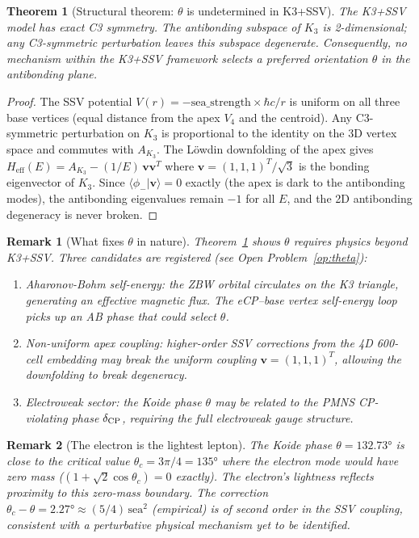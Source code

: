 \documentclass[11pt]{article}
\newtheorem{theorem}{Theorem}[section]
\newtheorem{remark}{Remark}[section]
\begin{document}
\begin{theorem}[Structural theorem: $\theta$ is undetermined in K3+SSV]
\label{thm:theta_free}
The K3+SSV model has exact C3 symmetry.  The antibonding subspace
of $K_3$ is 2-dimensional; any C3-symmetric perturbation leaves this
subspace degenerate.  Consequently, no mechanism within the K3+SSV
framework selects a preferred orientation $\theta$ in the antibonding
plane.
\end{theorem}

\begin{proof}
The SSV potential $V(r) = -\mathrm{sea\_strength}\times\hbar c/r$ is
uniform on all three base vertices (equal distance from the apex $V_4$
and the centroid).  Any C3-symmetric perturbation on $K_3$ is
proportional to the identity on the 3D vertex space and commutes
with $A_{K_3}$.  The Löwdin downfolding of the apex gives
$H_\mathrm{eff}(E) = A_{K_3} - (1/E)\,\mathbf{v}\mathbf{v}^T$ where
$\mathbf{v} = (1,1,1)^T/\sqrt{3}$ is the bonding eigenvector of $K_3$.
Since $\langle\phi_-|\mathbf{v}\rangle = 0$ exactly (the apex is dark
to the antibonding modes), the antibonding eigenvalues remain $-1$
for all $E$, and the 2D antibonding degeneracy is never broken.
\end{proof}

\begin{remark}[What fixes $\theta$ in nature]
Theorem~\ref{thm:theta_free} shows $\theta$ requires physics beyond K3+SSV.
Three candidates are registered (see Open Problem~\ref{op:theta}):
\begin{enumerate}
\item \emph{Aharonov-Bohm self-energy}: the ZBW orbital circulates on
  the K3 triangle, generating an effective magnetic flux.  The eCP--base
  vertex self-energy loop picks up an AB phase that could select $\theta$.
\item \emph{Non-uniform apex coupling}: higher-order SSV corrections
  from the 4D 600-cell embedding may break the uniform coupling
  $\mathbf{v} = (1,1,1)^T$, allowing the downfolding to break degeneracy.
\item \emph{Electroweak sector}: the Koide phase $\theta$ may be related
  to the PMNS CP-violating phase $\delta_{\rm CP}$, requiring the full
  electroweak gauge structure.
\end{enumerate}
\end{remark}

\begin{remark}[The electron is the lightest lepton]
The Koide phase $\theta = 132.73°$ is close to the critical value
$\theta_c = 3\pi/4 = 135°$ where the electron mode would have zero mass
($(1+\sqrt{2}\cos\theta_c) = 0$ exactly).  The electron's lightness
reflects proximity to this zero-mass boundary.  The correction
$\theta_c - \theta = 2.27° \approx (5/4)\,\mathrm{sea}^2$ (empirical)
is of second order in the SSV coupling, consistent with a perturbative
physical mechanism yet to be identified.
\end{remark}
\end{document}
